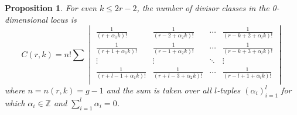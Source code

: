 \documentclass[11pt,reqno]{amsart}
\newcommand*{\Z}{\mathbb{Z}}
\theoremstyle{definition}
\theoremstyle{problem}
\theoremstyle{plain}
\newtheorem{proposition}[definition]{Proposition}
\theoremstyle{remark}
\theoremstyle{theorem}
\numberwithin{equation}{section}
\numberwithin{figure}{section}
\begin{document}
\begin{proposition}\label{prop:card}
  For even $k\leq2r-2$, the number of divisor classes in the 0-dimensional
  locus is
  \begin{equation} \label{eq:3} C(r,k) = n!\sum
    \begin{vmatrix}
      \frac{1}{(r+\alpha_1 k)!} & \frac{1}{(r-2+\alpha_2 k)!} & \cdots
      & \frac{1}{(r-k+2+\alpha_l k)!}\\
      \frac{1}{(r+1+\alpha_1 k)!} & \frac{1}{(r-1+\alpha_2 k)!} &
      \cdots
      & \frac{1}{(r-k+3+\alpha_l k)!}\\
      \vdots & \vdots & \ddots & \vdots\\
      \frac{1}{(r+l-1+\alpha_1 k)!} & \frac{1}{(r+l-3+\alpha_2 k)!}
      & \cdots & \frac{1}{(r-l+1+\alpha_l k)!}\\
    \end{vmatrix}
    \end{equation}
    where $n=n(r,k)=g-1$
    and the sum is taken over all $l$-tuples $(\alpha_i)_{i=1}^l$ for
    which $\alpha_i \in \Z$ and $\sum_{i=1}^l\alpha_i=0$.
\end{proposition}
\end{document}

